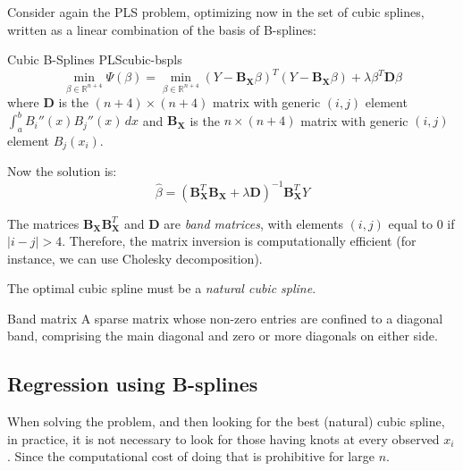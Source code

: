 Consider again the PLS problem, optimizing now in the set of cubic splines, written
as a linear combination of the basis of B-splines:
\begin{problem}{Cubic B-Splines PLS}{cubic-bspls}
    \begin{equation*}
        \min_{\beta \in \mathds R^{n+4}} \Psi(\beta) = \min_{\beta \in \mathds R^{n+4}}
        \left( Y - \boldsymbol B_{\boldsymbol X} \beta \right)^T
        \left( Y - \boldsymbol B_{\boldsymbol X} \beta \right)
        + \lambda \beta^T \boldsymbol D \beta
    \end{equation*}
    where $\boldsymbol D$ is the $(n+4)\times(n+4)$ matrix with generic $(i,j)$
    element $\int_a^b B_i''(x)B_j''(x)\,dx$ and $\boldsymbol B_{\boldsymbol X}$ is
    the $n \times (n+4)$ matrix with generic $(i,j)$ element $B_j(x_i)$.

    Now the solution is:
    \begin{equation*}
        \hat \beta = \left( \boldsymbol B_{\boldsymbol X}^T \boldsymbol B_{\boldsymbol X}
            + \lambda \boldsymbol D \right)^{-1} \boldsymbol B_{\boldsymbol X}^T Y
    \end{equation*}
    \tcblower
    \begin{note}
        The matrices $\boldsymbol B_{\boldsymbol X}\boldsymbol B_{\boldsymbol X}^T$ and
        $\boldsymbol D$ are \emph{band matrices}, with elements $(i,j)$ equal to 0 if
        $|i-j| > 4$. Therefore, the matrix inversion is computationally efficient
        (for instance, we can use Cholesky decomposition).
    \end{note}
    \begin{note}
        The optimal cubic spline must be a \emph{natural cubic spline}.
    \end{note}
\end{problem}

\begin{definition*}{Band matrix}{}
    A sparse matrix whose non-zero entries are confined to a diagonal band,
    comprising the main diagonal and zero or more diagonals on either side.
\end{definition*}

\subsection{Regression using B-splines}

When solving the  problem, and then looking for
the best (natural) cubic spline, in practice, it is not necessary to look
for those having knots at every observed $x_i$. Since the computational
cost of doing that is prohibitive for large $n$.

